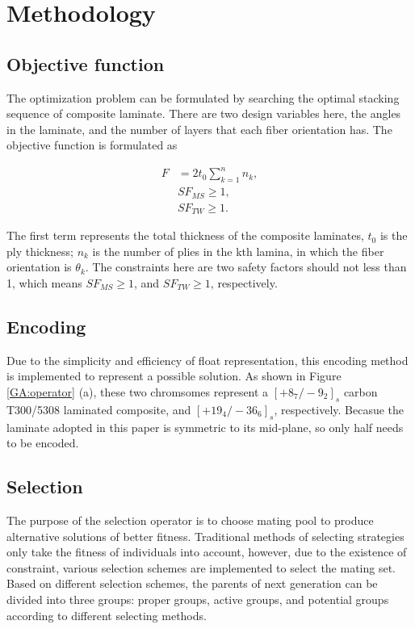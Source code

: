 \section{Methodology}
\subsection{Objective function}
The optimization problem can be formulated by searching the optimal stacking
sequence of composite laminate.  There are two design variables here, the angles
in the laminate, and the number of layers that each fiber orientation has. The
objective function is formulated as

\begin{equation}
	\begin{split}
    	F  &= 2t_0 \sum_{k=1}^n n_k  \textstyle{,}\\
    	   &SF_{MS} \geq 1 \textstyle{,} \\
    	   &SF_{TW} \geq 1 \textstyle{.}
	\end{split} 
\end{equation}

The first term represents the total thickness of the composite laminates, $t_0$
is the ply thickness; $n_k$ is the number of plies in the kth lamina, in which
the fiber orientation is $\theta_k$. The constraints here are two safety
factors should not less than 1, which means  $SF_{MS} \geq 1$, and $SF_{TW} \geq
1$, respectively.

\subsection{Encoding}
Due to the simplicity and efficiency of float representation, this encoding
method is implemented to represent a possible solution. As shown in Figure \ref{GA:operator}
 (a), these two chromsomes represent a $[+8_{7}/-9_{2}]_s$
carbon T300/5308 laminated composite, and $[+19_{4}/-36_{6}]_s$, respectively.
Becasue the laminate adopted in this paper is symmetric to its mid-plane, so
only half needs to be encoded.

\subsection{Selection}
The purpose of the selection operator is to choose mating pool to produce
alternative solutions of better fitness. Traditional methods of selecting
strategies only take the fitness of individuals into account, however, due to 
the existence of constraint, various selection schemes are implemented to
select the mating set. Based on different selection schemes, the parents of
next generation can be divided into  three groups: proper groups, active groups,
and potential groups according to different selecting methods. 

